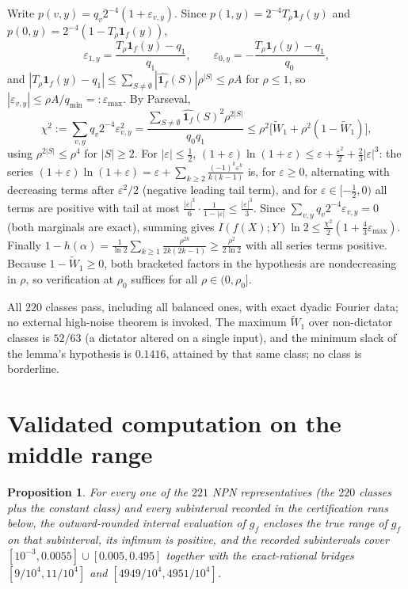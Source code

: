 \documentclass[12pt,draftclsnofoot,onecolumn,journal]{IEEEtran}
\newtheorem{proposition}{Proposition}
\newcommand{\ind}[1]{\mathbf{1}_{#1}}
\begin{document}
\begin{IEEEproof}
Write $p(v,y)=q_v2^{-4}(1+\varepsilon_{v,y})$. Since
$p(1,y)=2^{-4}T_\rho\ind f(y)$ and $p(0,y)=2^{-4}(1-T_\rho\ind f(y))$,
\[
\varepsilon_{1,y}=\frac{T_\rho\ind f(y)-q_1}{q_1},\qquad
\varepsilon_{0,y}=-\frac{T_\rho\ind f(y)-q_1}{q_0},
\]
and $|T_\rho\ind f(y)-q_1|\le\sum_{S\ne\emptyset}|\widehat{\ind f}(S)|
\rho^{|S|}\le\rho A$ for $\rho\le1$, so
$|\varepsilon_{v,y}|\le\rho A/q_{\min}=:\varepsilon_{\max}$. By Parseval,
\[
\chi^2:=\sum_{v,y}q_v2^{-4}\varepsilon_{v,y}^2
=\frac{\sum_{S\neq\emptyset}\widehat{\ind f}(S)^2\rho^{2|S|}}{q_0q_1}
\le\rho^2\bigl[\widetilde W_1+\rho^2(1-\widetilde W_1)\bigr],
\]
using $\rho^{2|S|}\le\rho^4$ for $|S|\ge2$. For $|\varepsilon|\le\tfrac12$,
$(1+\varepsilon)\ln(1+\varepsilon)\le\varepsilon+\tfrac{\varepsilon^2}2
+\tfrac23|\varepsilon|^3$: the series
$(1+\varepsilon)\ln(1+\varepsilon)=\varepsilon+\sum_{k\ge2}
\frac{(-1)^k\varepsilon^k}{k(k-1)}$ is, for $\varepsilon\ge0$, alternating
with decreasing terms after $\varepsilon^2/2$ (negative leading tail term),
and for $\varepsilon\in[-\tfrac12,0)$ all terms are positive with tail at
most $\tfrac{|\varepsilon|^3}{6}\cdot\frac1{1-|\varepsilon|}
\le\tfrac{|\varepsilon|^3}3$. Since
$\sum_{v,y}q_v2^{-4}\varepsilon_{v,y}=0$ (both marginals are exact), summing
gives $I(f(X);Y)\ln2\le\tfrac{\chi^2}2(1+\tfrac43\varepsilon_{\max})$.
Finally $1-h(\alpha)=\frac1{\ln2}\sum_{k\ge1}\frac{\rho^{2k}}{2k(2k-1)}
\ge\frac{\rho^2}{2\ln2}$ with all series terms positive. Because
$1-\widetilde W_1\ge0$, both bracketed factors in the hypothesis are
nondecreasing in $\rho$, so verification at $\rho_0$ suffices for all
$\rho\in(0,\rho_0]$.
\end{IEEEproof}

All $220$ classes pass, including all balanced ones, with exact dyadic
Fourier data; no external high-noise theorem is invoked. The maximum
$\widetilde W_1$ over non-dictator classes is $52/63$ (a dictator altered on
a single input), and the minimum slack of the lemma's hypothesis is
$0.1416$, attained by that same class; no class is borderline.

\section{Validated computation on the middle range}\label{sec:certify}

\begin{proposition}\label{prop:cert}
For every one of the $221$ NPN representatives (the $220$ classes plus the
constant class) and every subinterval recorded in the certification runs
below, the outward-rounded interval evaluation of $g_f$ encloses the true
range of $g_f$ on that subinterval, its infimum is positive, and the recorded
subintervals cover $[10^{-3},0.0055]\cup[0.005,0.495]$ together with the
exact-rational bridges $[9/10^4,11/10^4]$ and $[4949/10^4,4951/10^4]$.
\end{proposition}
\end{document}
